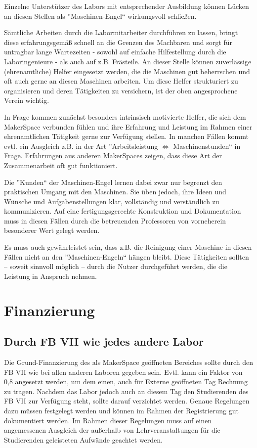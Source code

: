 \documentclass[parskip=half,headsepline,footsepline,titlepage]{scrartcl}
\begin{document}
Einzelne Unterstützer des Labors mit entsprechender Ausbildung können Lücken an diesen Stellen als ''Maschinen-Engel`` wirkungsvoll schließen.

Sämtliche Arbeiten durch die Labormitarbeiter durchführen zu lassen, bringt diese erfahrungsgemäß schnell an die Grenzen des Machbaren und sorgt für untragbar lange Wartezeiten - sowohl auf einfache Hilfestellung durch die Laboringenieure - als auch auf z.B. Frästeile. An dieser Stelle können zuverlässige (ehrenamtliche) Helfer eingesetzt werden, die die Maschinen gut beherrschen und oft auch gerne an diesen Maschinen arbeiten. Um diese Helfer strukturiert zu organisieren und deren Tätigkeiten zu versichern, ist der oben angesprochene Verein wichtig.

In Frage kommen zunächst besonders intrinsisch motivierte Helfer, die sich dem MakerSpace verbunden fühlen und ihre Erfahrung und Leistung im Rahmen einer ehrenamtlichen Tätigkeit gerne zur Verfügung stellen. In manchen Fällen kommt evtl. ein Ausgleich z.B. in der Art ''Arbeitsleistung $\Leftrightarrow$ Maschinenstunden`` in Frage.
Erfahrungen aus anderen MakerSpaces zeigen, dass diese Art der Zusammenarbeit oft gut funktioniert.

Die ''Kunden`` der Maschinen-Engel lernen dabei zwar nur begrenzt den praktischen Umgang mit den Maschinen. Sie üben jedoch, ihre Ideen und Wünsche und Aufgabenstellungen klar, vollständig und verständlich zu kommunizieren. Auf eine fertigungsgerechte Konstruktion und Dokumentation muss in diesen Fällen durch die betreuenden Professoren von vorneherein besonderer Wert gelegt werden.

Es muss auch gewährleistet sein, dass z.B. die Reinigung einer Maschine in diesen Fällen nicht an den ''Maschinen-Engeln`` hängen bleibt. Diese Tätigkeiten sollten -- soweit sinnvoll möglich -- durch die Nutzer durchgeführt werden, die die Leistung in Anspruch nehmen.


\section{Finanzierung}

\subsection{Durch FB VII wie jedes andere Labor}
Die Grund-Finanzierung des als MakerSpace geöffneten Bereiches sollte durch den FB VII wie bei allen anderen Laboren gegeben sein. Evtl. kann ein Faktor von 0,8 angesetzt werden, um dem einen, auch für Externe geöffneten Tag Rechnung zu tragen. Nachdem das Labor jedoch auch an diesem Tag den Studierenden des FB VII zur Verfügung steht, sollte darauf verzichtet werden.
Genaue Regelungen dazu müssen festgelegt werden und können im Rahmen der Registrierung gut dokumentiert werden. Im Rahmen dieser Regelungen muss auf einen angemessenen Ausgleich der außerhalb von Lehrveranstaltungen für die Studierenden geleisteten Aufwände geachtet werden.
\end{document}
